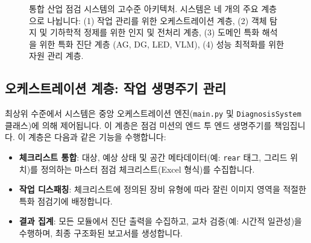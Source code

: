 \begin{figure}[t]
\centering
\fbox{\rule{0pt}{3in} \rule{0.95\linewidth}{0pt}} %
\caption{통합 산업 점검 시스템의 고수준 아키텍처. 시스템은 네 개의 주요 계층으로 나뉩니다: (1) 작업 관리를 위한 오케스트레이션 계층, (2) 객체 탐지 및 기하학적 정제를 위한 인지 및 전처리 계층, (3) 도메인 특화 해석을 위한 특화 진단 계층 (AG, DG, LED, VLM), (4) 성능 최적화를 위한 자원 관리 계층.}
\label{fig:architecture}
\end{figure}

\subsection{오케스트레이션 계층: 작업 생명주기 관리}
최상위 수준에서 시스템은 중앙 오케스트레이션 엔진(\texttt{main.py} 및 \texttt{DiagnosisSystem} 클래스)에 의해 제어됩니다.
이 계층은 점검 미션의 엔드 투 엔드 생명주기를 책임집니다.
이 계층은 다음과 같은 기능을 수행합니다:
\begin{itemize}
    \item \textbf{체크리스트 통합}: 대상, 예상 상태 및 공간 메타데이터(예: \texttt{rear} 태그, 그리드 위치)를 정의하는 마스터 점검 체크리스트(Excel 형식)를 수집합니다.
    \item \textbf{작업 디스패칭}: 체크리스트에 정의된 장비 유형에 따라 잘린 이미지 영역을 적절한 특화 점검기에 배정합니다.
    \item \textbf{결과 집계}: 모든 모듈에서 진단 출력을 수집하고, 교차 검증(예: 시간적 일관성)을 수행하며, 최종 구조화된 보고서를 생성합니다.
\end{itemize}

